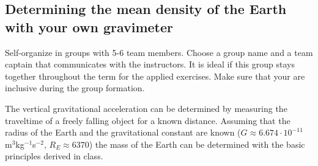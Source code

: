 \documentclass[a4paper,12pt]{article}
\begin{document}
\subsection{Determining the mean density of the Earth with your own gravimeter}
\begin{tcolorbox}[enhanced jigsaw,breakable,pad at break*=1mm,
    colback=blue!5!white,colframe=burgundy,title=Group Work,
    watermark color=white]
    Self-organize in groups with 5-6 team members. Choose a group name and a team captain that communicates with the instructors. It is ideal if this group stays together throughout the term for the applied exercises. Make sure that your are inclusive during the group formation.
\end{tcolorbox}

  The vertical gravitational acceleration can be determined by measuring the traveltime of a freely falling object for a known distance. Assuming that the radius of the Earth and the gravitational constant are known ($G\approx6.674\cdot10^{-11}$ m$^{3}$kg$^{-1}$s$^{-2}$, $R_E \approx 6370 $) the mass of the Earth can be determined with the basic principles derived in class.
\end{document}
